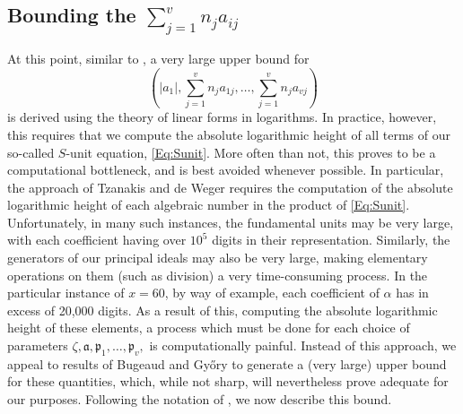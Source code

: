 {\subsection{Bounding the $\sum_{j = 1}^v n_ja_{ij}$}

At this point, similar to \cite{TW3}, a very large upper bound for 
\[\left(|a_1|, \sum_{j = 1}^v n_ja_{1j}, \dots, \sum_{j = 1}^v n_ja_{vj}\right)\]
is derived using the theory of linear forms in logarithms. In practice, however, this requires that we compute the absolute logarithmic height of all terms of our so-called $S$-unit equation, \eqref{Eq:Sunit}. More often than not, this proves to be a computational bottleneck, and is best avoided whenever possible. In particular, the approach of Tzanakis and de Weger \cite{TW3}  requires the computation of the absolute logarithmic height of each algebraic number in the product of \eqref{Eq:Sunit}. Unfortunately, in many such instances, the fundamental units may be very large, with each coefficient having over $10^5$ digits in their representation. Similarly, the generators of our principal ideals may also be very large, making elementary operations on them (such as division) a very time-consuming process. In the particular instance of $x = 60$, by way of example, each coefficient of $\alpha$ has in excess of 20,000 digits. As a result of this, computing the absolute logarithmic height of these elements, a process which must be done for each choice of parameters $\zeta, \mathfrak{a}, \mathfrak{p}_1, \dots, \mathfrak{p}_v,$ is  computationally painful. Instead of this approach, we appeal to results of Bugeaud and Gy\H{o}ry  \cite{BugeaudGyory} to generate a (very large) upper bound for these quantities, which, while not sharp, will nevertheless prove adequate for our purposes. Following the notation of \cite{BugeaudGyory}, we now describe this bound.  

}

